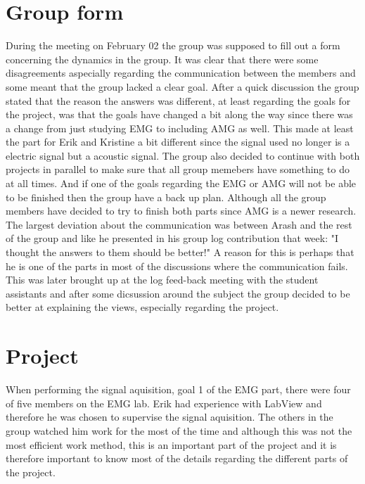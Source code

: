 \section{Group form}
During the meeting on February 02 the group was supposed to fill out a form concerning the dynamics in the group. It was clear that there were some disagreements aspecially regarding the communication between the members and some meant that the group lacked a clear goal. After a quick discussion the group stated that the reason the answers was different, at least regarding the goals for the project, was that the goals have changed a bit along the way since there was a change from just studying EMG to including AMG as well. This made at least the part for Erik and Kristine a bit different since the signal used no longer is a electric signal but a acoustic signal. The group also decided to continue with both projects in parallel to make sure that all group memebers have something to do at all times. And if one of the goals regarding the EMG or AMG will not be able to be finished then the group have a back up plan. Although all the group members have decided to try to finish both parts since AMG is a newer research. The largest deviation about the communication was between Arash and the rest of the group and like he presented in his group log contribution that week: "I thought the answers to them should be better!" A reason for this is perhaps that he is one of the parts in most of the discussions where the communication fails. This was later brought up at the log feed-back meeting with the student assistants and after some dicsussion around the subject the group decided to be better at explaining the views, especially regarding the project. %

\section{Project}
When performing the signal aquisition, goal 1 of the EMG part, there were four of five members on the EMG lab. Erik had experience with LabView and therefore he was chosen to supervise the signal aquisition. The others in the group watched him work for the most of the time and although this was not the most efficient work method, this is an important part of the project and it is therefore important to know most of the details regarding the different parts of the project. 